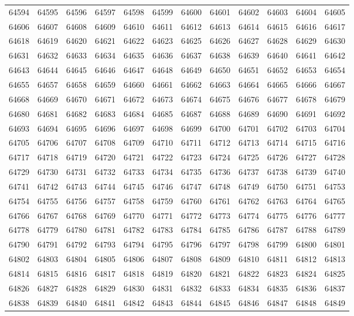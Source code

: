 \begin{center}
\begin{longtable}{llllllllllll}
64594 &64595 &64596 &64597 &64598 &64599 &64600 &64601 &64602 &64603 &64604 &64605 \\
64606 &64607 &64608 &64609 &64610 &64611 &64612 &64613 &64614 &64615 &64616 &64617 \\
64618 &64619 &64620 &64621 &64622 &64623 &64625 &64626 &64627 &64628 &64629 &64630 \\
64631 &64632 &64633 &64634 &64635 &64636 &64637 &64638 &64639 &64640 &64641 &64642 \\
64643 &64644 &64645 &64646 &64647 &64648 &64649 &64650 &64651 &64652 &64653 &64654 \\
64655 &64657 &64658 &64659 &64660 &64661 &64662 &64663 &64664 &64665 &64666 &64667 \\
64668 &64669 &64670 &64671 &64672 &64673 &64674 &64675 &64676 &64677 &64678 &64679 \\
64680 &64681 &64682 &64683 &64684 &64685 &64687 &64688 &64689 &64690 &64691 &64692 \\
64693 &64694 &64695 &64696 &64697 &64698 &64699 &64700 &64701 &64702 &64703 &64704 \\
64705 &64706 &64707 &64708 &64709 &64710 &64711 &64712 &64713 &64714 &64715 &64716 \\
64717 &64718 &64719 &64720 &64721 &64722 &64723 &64724 &64725 &64726 &64727 &64728 \\
64729 &64730 &64731 &64732 &64733 &64734 &64735 &64736 &64737 &64738 &64739 &64740 \\
64741 &64742 &64743 &64744 &64745 &64746 &64747 &64748 &64749 &64750 &64751 &64753 \\
64754 &64755 &64756 &64757 &64758 &64759 &64760 &64761 &64762 &64763 &64764 &64765 \\
64766 &64767 &64768 &64769 &64770 &64771 &64772 &64773 &64774 &64775 &64776 &64777 \\
64778 &64779 &64780 &64781 &64782 &64783 &64784 &64785 &64786 &64787 &64788 &64789 \\
64790 &64791 &64792 &64793 &64794 &64795 &64796 &64797 &64798 &64799 &64800 &64801 \\
64802 &64803 &64804 &64805 &64806 &64807 &64808 &64809 &64810 &64811 &64812 &64813 \\
64814 &64815 &64816 &64817 &64818 &64819 &64820 &64821 &64822 &64823 &64824 &64825 \\
64826 &64827 &64828 &64829 &64830 &64831 &64832 &64833 &64834 &64835 &64836 &64837 \\
64838 &64839 &64840 &64841 &64842 &64843 &64844 &64845 &64846 &64847 &64848 &64849 \\

\end{longtable}
\end{center}
